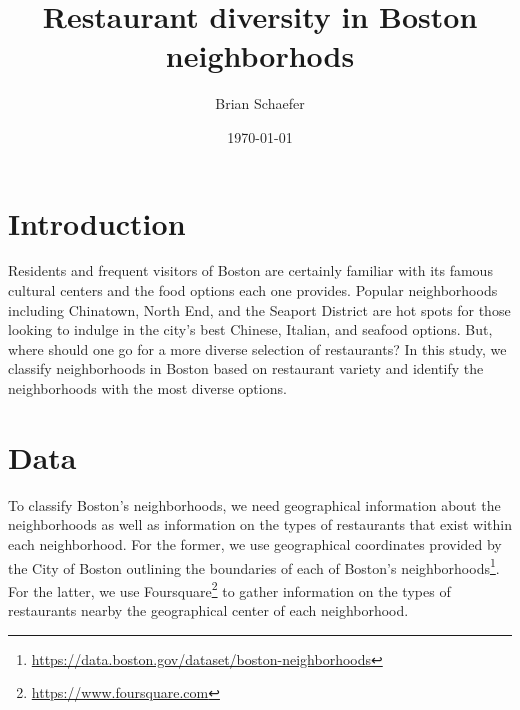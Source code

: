 \documentclass[11pt, a4paper]{article} %
\title{Restaurant diversity in Boston neighborhods} %
\author{
Brian Schaefer %
  }
\date{\small \today} %
\begin{document}
%

\maketitle %


\setcounter{page}{1} %

\section{Introduction}

Residents and frequent visitors of Boston are certainly familiar with its famous cultural centers and the food options each one provides.
Popular neighborhoods including Chinatown, North End, and the Seaport District are hot spots for those looking to indulge in the city's best Chinese, Italian, and seafood options.
But, where should one go for a more diverse selection of restaurants?
In this study, we classify neighborhoods in Boston based on restaurant variety and identify the neighborhoods with the most diverse options.

\section{Data}

To classify Boston's neighborhoods, we need geographical information about the neighborhoods as well as information on the types of restaurants that exist within each neighborhood.
For the former, we use geographical coordinates provided by the City of Boston outlining the boundaries of each of Boston's neighborhoods\footnote{\url{https://data.boston.gov/dataset/boston-neighborhoods}}.
For the latter, we use Foursquare\footnote{\url{https://www.foursquare.com}} to gather information on the types of restaurants nearby the geographical center of each neighborhood.
\end{document}
